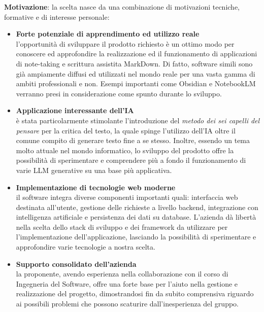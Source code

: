 \documentclass[a4paper,10pt]{article}
\begin{document}
\textbf{Motivazione}: la scelta nasce da una combinazione di motivazioni tecniche, formative e di interesse personale:
\begin{itemize}
    \item \textbf{Forte potenziale di apprendimento ed utilizzo reale}\\
    l'opportunità di sviluppare il prodotto richiesto è un ottimo modo per conoscere ed approfondire la realizzazione ed il funzionamento di applicazioni di note-taking e scrittura assistita MarkDown. Di fatto, software simili sono già ampiamente diffusi ed utilizzati nel mondo reale per una vasta gamma di ambiti professionali e non. Esempi importanti come Obsidian e NotebookLM verranno presi in considerazione come spunto durante lo sviluppo.
    \item \textbf{Applicazione interessante dell'IA}\\
    è stata particolarmente stimolante l'introduzione del \textit{metodo dei sei capelli del pensare} per la critica del testo, la quale spinge l'utilizzo dell'IA oltre il comune compito di generare testo fine a se stesso. Inoltre, essendo un tema molto attuale nel mondo informatico, lo sviluppo del prodotto offre la possibilità di sperimentare e comprendere più a fondo il funzionamento di varie LLM generative su una base più applicativa.
    \item \textbf{Implementazione di tecnologie web moderne}\\
    il software integra diverse componenti importanti quali: interfaccia web destinata all'utente, gestione delle richieste a livello backend, integrazione con intelligenza artificiale e persistenza dei dati su database. L'azienda dà libertà nella scelta dello stack di sviluppo e dei framework da utilizzare per l'implementazione dell'applicazione, lasciando la possibilità di sperimentare e approfondire varie tecnologie a nostra scelta.
    \item \textbf{Supporto consolidato dell'azienda}\\
    la proponente, avendo esperienza nella collaborazione con il corso di Ingegneria del Software, offre una forte base per l'aiuto nella gestione e realizzazione del progetto, dimostrandosi fin da subito comprensiva riguardo ai possibili problemi che possono scaturire dall'inesperienza del gruppo.
\end{itemize}

\newpage
\end{document}
